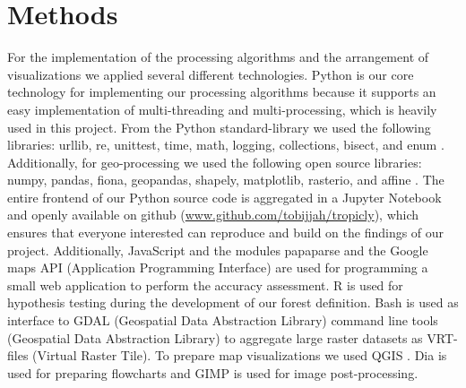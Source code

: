 \section{Methods}
\label{sec:methods}
	For the implementation of the processing algorithms and the arrangement of visualizations we applied several different technologies. Python is our core technology for implementing our processing algorithms because it supports an easy implementation of multi-threading and multi-processing, which is heavily used in this project. From the Python standard-library we used the following libraries: urllib, re, unittest, time, math, logging, collections, bisect, and enum \citep{Rossum2018}. Additionally, for geo-processing we used the following open source libraries: numpy, pandas, fiona, geopandas, shapely, matplotlib, rasterio, and affine \citep{Hunter2007,McKinney2010,Walt2011,Development2019}. The entire frontend of our Python source code is aggregated in a Jupyter Notebook and openly available on github (\url{www.github.com/tobijjah/tropicly}), which ensures that everyone interested can reproduce and build on the findings of our project. Additionally, JavaScript and the modules papaparse and the Google maps \ac{API} (Application Programming Interface) are used for programming a small web application to perform the accuracy assessment. R is used for hypothesis testing during the development of our forest definition. Bash is used as interface to GDAL (Geospatial Data Abstraction Library) command line tools (Geospatial Data Abstraction Library) to aggregate large raster datasets as VRT-files (Virtual Raster Tile). To prepare map visualizations we used QGIS \citep{QGIS2009}. Dia is used for preparing flowcharts and GIMP is used for image post-processing.

